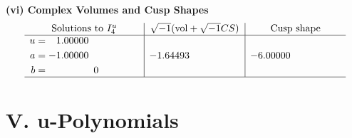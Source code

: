 \documentclass[1p]{elsarticle_modified}
\theoremstyle{definition}
\newcommand{\I}{\sqrt{-1}}
\begin{document}
\newpage\flushleft \textbf{(vi) Complex Volumes and Cusp Shapes}
$$\begin{array}{c|c|c}  
\text{Solutions to }I^u_{4}& \I (\text{vol} + \sqrt{-1}CS) & \text{Cusp shape}\\
 \hline 
\begin{aligned}
u &= \phantom{-}1.00000\phantom{ +0.000000I} \\
a &= -1.00000\phantom{ +0.000000I} \\
b &= \phantom{-0.000000 } 0\end{aligned}
 & -1.64493\phantom{ +0.000000I} & -6.00000\phantom{ +0.000000I}\\
 \hline 
 \end{array}$$\newpage
\newpage\renewcommand{\arraystretch}{1}
\centering \section*{ V. u-Polynomials}
\end{document}
